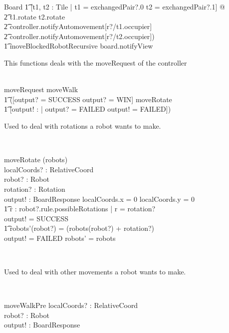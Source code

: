 \begin{class}{Board}
\t1 [t1, t2 : Tile | t1 = exchangedPair?.0 \wedge t2 = exchangedPair?.1] @ \\ \t2 t1.rotate \wedge t2.rotate \; \; \wedge \\ \t2 controller.notifyAutomovement[r?/t1.occupier] \; \; \wedge \\ \t2 controller.notifyAutomovement[r?/t2.occupier]) \; \; \comp \\ \t1 moveBlockedRobotRecursive \comp board.notifyView \\
\begin{classcom}
This functions deals with the moveRequest of the controller
\end{classcom} \\
moveRequest \sdef moveWalk \; \; \comp \\ \t1 ([output? = SUCCESS \vee output? = WIN] \wedge moveRotate \; \; [] \\ \t1 [output! : \bool | output? = FAILED \wedge output! = FAILED]) \\
\begin{classcom}
Used to deal with rotations a robot wants to make.
\end{classcom} \\
\begin{schema}{moveRotate}
\Delta(robots) \\
localCoords? : RelativeCoord \\
robot? : Robot \\
rotation? : Rotation \\
output! : BoardResponse
\where
\IF localCoords.x = 0 \wedge localCoords.y = 0 \; \; \wedge \\ \t1
 \exists r : robot?.rule.possibleRotations | r = rotation?\\
\THEN output! = SUCCESS \; \; \wedge \\ \t1
robots'(robot?) = (robots(robot?) + rotation?)  \\
\ELSE output! = FAILED \wedge robots' = robots
\end{schema} \\
\begin{classcom}
Used to deal with other movements a robot wants to make.
\end{classcom} \\
\znewpage
\begin{schema}{moveWalkPre}
localCoords? : RelativeCoord \\
robot? : Robot \\
output! : BoardResponse \\

\end{schema}
\end{class}
